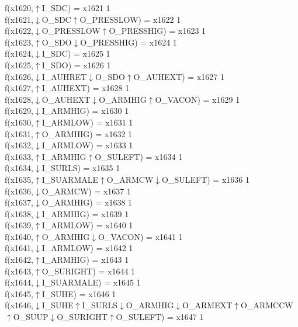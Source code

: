 f(x1620,$\uparrow$I\_SDC) = x1621 {1} \\
f(x1621,$\downarrow$O\_SDC$\uparrow$O\_PRESSLOW) = x1622 {1} \\
f(x1622,$\downarrow$O\_PRESSLOW$\uparrow$O\_PRESSHIG) = x1623 {1} \\
f(x1623,$\uparrow$O\_SDO$\downarrow$O\_PRESSHIG) = x1624 {1} \\
f(x1624,$\downarrow$I\_SDC) = x1625 {1} \\
f(x1625,$\uparrow$I\_SDO) = x1626 {1} \\
f(x1626,$\downarrow$I\_AUHRET$\downarrow$O\_SDO$\uparrow$O\_AUHEXT) = x1627 {1} \\
f(x1627,$\uparrow$I\_AUHEXT) = x1628 {1} \\
f(x1628,$\downarrow$O\_AUHEXT$\downarrow$O\_ARMHIG$\uparrow$O\_VACON) = x1629 {1} \\
f(x1629,$\downarrow$I\_ARMHIG) = x1630 {1} \\
f(x1630,$\uparrow$I\_ARMLOW) = x1631 {1} \\
f(x1631,$\uparrow$O\_ARMHIG) = x1632 {1} \\
f(x1632,$\downarrow$I\_ARMLOW) = x1633 {1} \\
f(x1633,$\uparrow$I\_ARMHIG$\uparrow$O\_SULEFT) = x1634 {1} \\
f(x1634,$\downarrow$I\_SURLS) = x1635 {1} \\
f(x1635,$\uparrow$I\_SUARMALE$\uparrow$O\_ARMCW$\downarrow$O\_SULEFT) = x1636 {1} \\
f(x1636,$\downarrow$O\_ARMCW) = x1637 {1} \\
f(x1637,$\downarrow$O\_ARMHIG) = x1638 {1} \\
f(x1638,$\downarrow$I\_ARMHIG) = x1639 {1} \\
f(x1639,$\uparrow$I\_ARMLOW) = x1640 {1} \\
f(x1640,$\uparrow$O\_ARMHIG$\downarrow$O\_VACON) = x1641 {1} \\
f(x1641,$\downarrow$I\_ARMLOW) = x1642 {1} \\
f(x1642,$\uparrow$I\_ARMHIG) = x1643 {1} \\
f(x1643,$\uparrow$O\_SURIGHT) = x1644 {1} \\
f(x1644,$\downarrow$I\_SUARMALE) = x1645 {1} \\
f(x1645,$\uparrow$I\_SUHE) = x1646 {1} \\
f(x1646,$\downarrow$I\_SUHE$\uparrow$I\_SURLS$\downarrow$O\_ARMHIG$\downarrow$O\_ARMEXT$\uparrow$O\_ARMCCW$\uparrow$O\_SUUP$\downarrow$O\_SURIGHT$\uparrow$O\_SULEFT) = x1647 {1} \\
